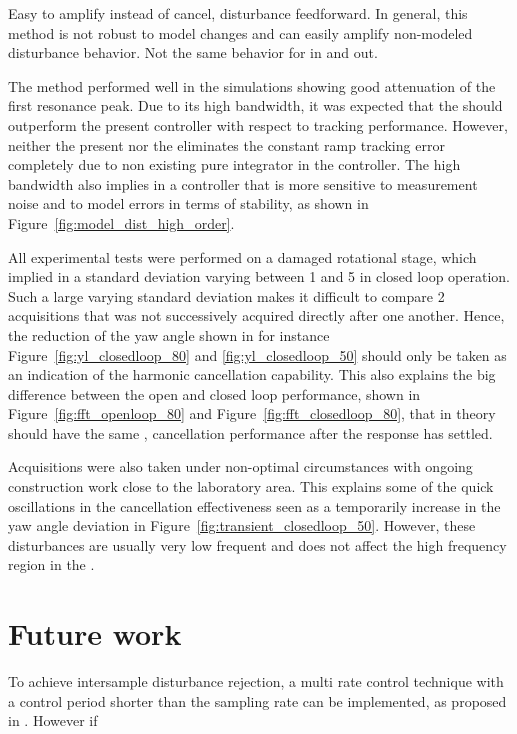 Easy to amplify instead of cancel, disturbance feedforward.  In general, this method is not robust to model changes and can easily amplify non-modeled disturbance behavior. Not the same behavior for in and out.



The \abbrIRC method performed well in the simulations showing good attenuation of the first resonance peak. Due to its high bandwidth, it was expected that the \abbrIRC should outperform the present controller with respect to tracking performance. However, neither the present nor the \abbrIRC eliminates the constant ramp tracking error completely due to non existing pure integrator in the controller. The high bandwidth also implies in a controller that is more sensitive to measurement noise and to model errors in terms of stability, as shown in Figure~\ref{fig:model_dist_high_order}.



All experimental tests were performed on a damaged rotational stage, which implied in a standard deviation varying between \unit{1}{\micro\radian} and \unit{5}{\micro\radian} in closed loop operation. Such a large varying standard deviation makes it difficult to compare 2 acquisitions that was not successively acquired directly after one another. Hence, the reduction of the yaw angle shown in for instance Figure~\ref{fig:yl_closedloop_80} and \ref{fig:yl_closedloop_50} should only be taken as an indication of the harmonic cancellation capability. This also explains the big difference between the open and closed loop performance, shown in Figure~\ref{fig:fft_openloop_80} and Figure~\ref{fig:fft_closedloop_80}, that in theory should have the same , cancellation performance after the response has settled.

Acquisitions were also taken under non-optimal circumstances with ongoing construction work close to the laboratory area. This explains some of the quick oscillations in the cancellation effectiveness seen as a temporarily increase in the yaw angle deviation in Figure~\ref{fig:transient_closedloop_50}. However, these disturbances are usually very low frequent and does not affect the high frequency region in the \abbrFFT.



\section{Future work}

To achieve intersample disturbance rejection, a multi rate control technique with a control period shorter than the sampling rate can be implemented, as proposed in \citep{fujimoto2009rro}. However if
